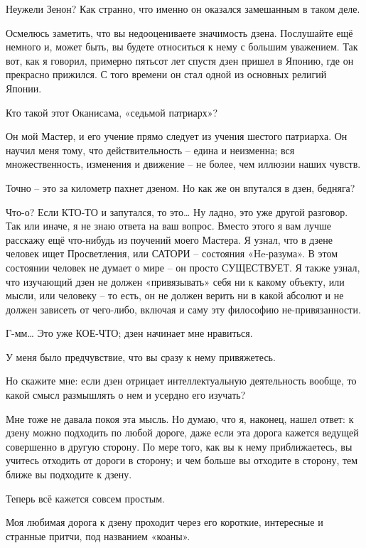 \documentclass[../main.tex]{subfiles}
\begin{document}
\begin{dialogue}
 Неужели Зенон? Как странно, что именно он оказался замешанным в таком деле.

 Осмелюсь заметить, что вы недооцениваете значимость дзена. Послушайте ещё немного и, может быть, вы будете относиться к нему с большим уважением. Так вот, как я говорил, примерно пятьсот лет спустя дзен пришел в Японию, где он прекрасно прижился. С того времени он стал одной из основных религий Японии.

 Кто такой этот Оканисама, «седьмой патриарх»?

 Он мой Мастер, и его учение прямо следует из учения шестого патриарха. Он научил меня тому, что действительность \--- едина и неизменна; вся множественность, изменения и движение \--- не более, чем иллюзии наших чувств.

 Точно \--- это за километр пахнет дзеном. Но как же он впутался в дзен, бедняга?

 Что-о? Если КТО-ТО и запутался, то это\ldots{} Ну ладно, это уже другой разговор. Так или иначе, я не знаю ответа на ваш вопрос. Вместо этого я вам лучше расскажу ещё что-нибудь из поучений моего Мастера. Я узнал, что в дзене человек ищет Просветления, или САТОРИ \--- состояния «He-разума». В этом состоянии человек не думает о мире \--- он просто СУЩЕСТВУЕТ\@. Я также узнал, что изучающий дзен не должен «привязывать» себя ни к какому объекту, или мысли, или человеку \--- то есть, он не должен верить ни в какой абсолют и не должен зависеть от чего-либо, включая и саму эту философию не-привязанности.

 Г-мм\ldots{} Это уже КОЕ-ЧТО; дзен начинает мне нравиться.

 У меня было предчувствие, что вы сразу к нему привяжетесь.

 Но скажите мне: если дзен отрицает интеллектуальную деятельность вообще, то какой смысл размышлять о нем и усердно его изучать?

 Мне тоже не давала покоя эта мысль. Но думаю, что я, наконец, нашел ответ: к дзену можно подходить по любой дороге, даже если эта дорога кажется ведущей совершенно в другую сторону. По мере того, как вы к нему приближаетесь, вы учитесь отходить от дороги в сторону; и чем больше вы отходите в сторону, тем ближе вы подходите к дзену.

 Теперь всё кажется совсем простым.

 Моя любимая дорога к дзену проходит через его короткие, интересные и странные притчи, под названием «коаны».


\end{dialogue}
\end{document}
